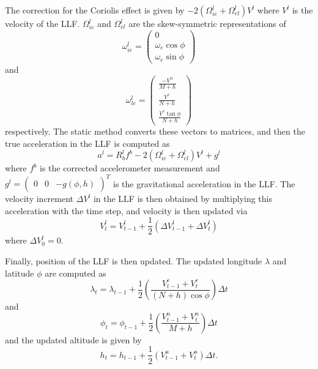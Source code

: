 \documentclass[11pt, oneside]{article}   	%
\begin{document}
The correction for the Coriolis effect is given by $-2(\Omega_{ie}^l+\Omega_{el}^l)V^l$ where $V^l$ is the velocity of the LLF.  $\Omega_{ie}^l$ and $\Omega_{el}^l$ are the skew-symmetric representations of 
\begin{equation}
\omega_{ie}^l=\begin{pmatrix}
0 \\
\omega_e\cos\phi \\
\omega_e\sin\phi
\end{pmatrix}
\end{equation}
and
\begin{equation}
\omega_{le}^l=\begin{pmatrix}
\frac{-V^n}{M+h} \\[.1cm]
\frac{V^e}{N+h} \\[.1cm]
\frac{V^e\tan\phi}{N+h}
\end{pmatrix}
\end{equation}
respectively.  The static method  converts these vectors to matrices, and then the true acceleration in the LLF is computed as
\begin{equation}
a^l=R_b^lf^b-2(\Omega_{ie}^l+\Omega_{el}^l)V^l+g^l
\end{equation}
where $f^b$ is the corrected accelerometer measurement and $g^l=\begin{pmatrix}0&0&-g(\phi, h)\end{pmatrix}^T$ is the gravitational acceleration in the LLF.  The velocity increment $\Delta V^l$ in the LLF is then obtained by multiplying this acceleration with the time step, and velocity is then updated via
\begin{equation}
V^l_t=V^l_{t-1}+\frac12\left(\Delta V^l_{t-1}+\Delta V^l_t\right)
\end{equation}
where $\Delta V^l_0=0$.

Finally, position of the LLF is then updated.  The updated longitude $\lambda$ and latitude $\phi$ are computed as
\begin{equation}
\lambda_t=\lambda_{t-1}+\frac12\left(\frac{V^e_{t-1}+V^e_t}{(N+h)\cos\phi}\right)\Delta t
\end{equation}
and
\begin{equation}
\phi_t=\phi_{t-1}+\frac12\left(\frac{V^n_{t-1}+V^n_t}{M+h}\right)\Delta t
\end{equation}
and the updated altitude is given by
\begin{equation}
h_t=h_{t-1}+\frac12\left(V^u_{t-1}+V^u_t\right)\Delta t.
\end{equation}
\end{document}
